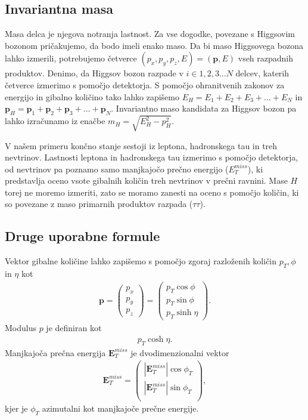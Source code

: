 \documentclass[11pt,a4paper,openany]{book}
\begin{document}
\subsection{Invariantna masa}
Masa delca je njegova notranja lastnost. Za vse dogodke, povezane s Higgsovim bozonom pričakujemo, da bodo imeli enako maso. Da bi maso Higgsovega bozona lahko izmerili, potrebujemo četverce $(p_x, p_y, p_z, E) = (\mathbf{p}, E)$ vseh razpadnih produktov. Denimo, da Higgsov bozon razpade v $i \in 1, 2, 3 ... N$ delcev, katerih četverce izmerimo s pomočjo detektorja. S pomočjo ohranitvenih zakonov za energijo in gibalno količino tako lahko zapišemo $E_H = E_1 + E_2 + E_3 + ... + E_N$ in $\mathbf{p}_H = \mathbf{p}_1 + \mathbf{p}_2 + \mathbf{p}_3 + ... + \mathbf{p}_N$. Invariantno maso kandidata za Higgsov bozon pa lahko izračunamo iz enačbe $m_H = \sqrt{E_H^2 - p_H^2}$.

V našem primeru končno stanje sestoji iz leptona, hadronskega tau in treh nevtrinov. Lastnosti leptona in hadronskega tau izmerimo s pomočjo detektorja, od nevtrinov pa poznamo samo manjkajočo prečno energijo ($E^{miss}_T$), ki predstavlja oceno vsote gibalnih količin treh nevtrinov v prečni ravnini. Mase $H$ torej ne moremo izmeriti, zato se moramo zanesti na oceno s pomočjo količin, ki so povezane z maso primarnih produktov razpada ($\tau\tau$).

\subsection{Druge uporabne formule}

Vektor gibalne količine lahko zapišemo s pomočjo zgoraj razloženih količin $p_T, \phi$ in $\eta$ kot
\begin{eqnarray}
	\mathbf{p} = \left( 
		\begin{array}{c}
			p_x \\
			p_y \\
			p_z 
		\end{array}
	\right) = \left(
		\begin{array}{c}
			p_T \cos \phi \\
			p_T \sin \phi \\
			p_T \sinh \eta
		\end{array}
	\right).
	\label{eq:momentum}
\end{eqnarray}
Modulus $p$ je definiran kot
\begin{eqnarray}
	p_T \cosh \eta.
\end{eqnarray}
Manjkajoča prečna energija $\mathbf{E}^{miss}_T$ je dvodimenzionalni vektor
\begin{eqnarray}
	\mathbf{E}^{miss}_T = \left(
		\begin{array}{c}
			|\mathbf{E}^{miss}_T| \cos \phi_T \\
			|\mathbf{E}^{miss}_T| \sin \phi_T \\
		\end{array}
	\right),
	\label{eq:emisst}
\end{eqnarray}
kjer je $\phi_T$ azimutalni kot manjkajoče prečne energije.
\end{document}
